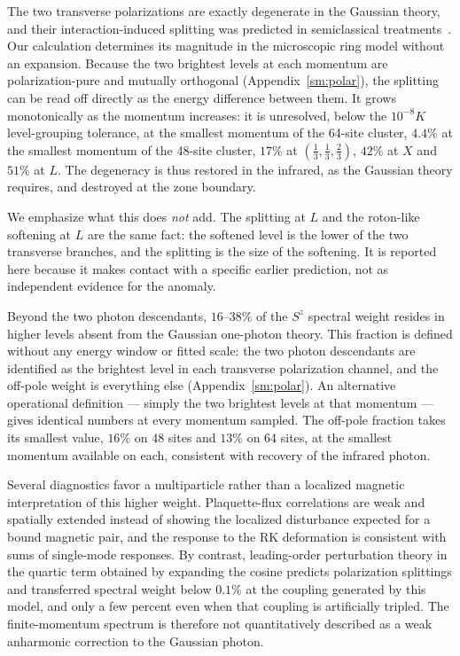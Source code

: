 \documentclass[aps,prl,twocolumn,amsmath,amssymb,superscriptaddress,
longbibliography,floatfix]{revtex4-2}
\begin{document}
The two transverse polarizations are exactly degenerate in the
Gaussian theory, and their interaction-induced splitting was predicted
in semiclassical treatments~\cite{Kwasigroch2017,Kwasigroch2020}. Our
calculation determines its magnitude in the microscopic ring model
without an expansion. Because the two brightest levels at each
momentum are polarization-pure and mutually orthogonal
(Appendix~\ref{sm:polar}), the splitting can be read off
directly as the energy difference between them. It grows
monotonically as the momentum increases: it is unresolved, below the
$10^{-8}K$ level-grouping tolerance, at the smallest momentum of the
64-site cluster, $4.4\%$ at the smallest momentum of the 48-site
cluster, $17\%$ at $(\frac13,\frac13,\frac23)$, $42\%$ at $X$ and
$51\%$ at $L$. The degeneracy is thus restored in the infrared, as
the Gaussian theory requires, and destroyed at the zone boundary.

We emphasize what this does \emph{not} add. The splitting at $L$ and
the roton-like softening at $L$ are the same fact: the softened level
is the lower of the two transverse branches, and the splitting is the
size of the softening. It is reported here because it makes contact
with a specific earlier prediction, not as independent evidence for
the anomaly.

Beyond the two photon descendants, $16$--$38\%$ of the $S^z$ spectral
weight resides in higher levels absent from the Gaussian one-photon
theory. This fraction is defined without any energy window or fitted
scale: the two photon descendants are identified as the brightest
level in each transverse polarization channel, and the off-pole weight
is everything else (Appendix~\ref{sm:polar}). An alternative
operational definition --- simply the two brightest levels at that
momentum --- gives identical numbers at every momentum sampled. The
off-pole fraction takes its smallest value, $16\%$ on 48 sites and
$13\%$ on 64 sites, at the smallest momentum available on each,
consistent with recovery of the infrared photon.

Several diagnostics favor a multiparticle rather than a localized
magnetic interpretation of this higher weight. Plaquette-flux
correlations are weak and spatially extended instead of showing the
localized disturbance expected for a bound magnetic pair, and the
response to the RK deformation is consistent with sums of single-mode
responses. By contrast, leading-order perturbation theory in the
quartic term obtained by expanding the cosine predicts polarization
splittings and transferred spectral weight below $0.1\%$ at the
coupling generated by this model, and only a few percent even when that
coupling is artificially tripled. The finite-momentum spectrum is
therefore not quantitatively described as a weak anharmonic correction
to the Gaussian photon.
\end{document}
